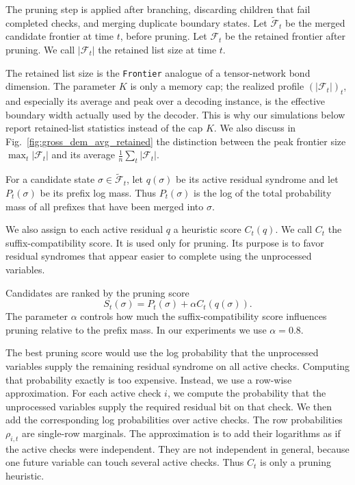 \documentclass[a4paper,twocolumn,11pt,unpublished]{quantumarticle}
\newcommand{\frontier}{\texttt{Frontier}}
\begin{document}
The pruning step is applied after branching, discarding children that fail
completed checks, and merging duplicate boundary states. Let
\(\widetilde{\mathcal F}_t\) be the merged candidate frontier at time \(t\),
before pruning. Let \(\mathcal F_t\) be the retained frontier after pruning. We
call \(|\mathcal F_t|\) the retained list size at time \(t\).


The retained list size is the \frontier{} analogue of a tensor-network
bond dimension. The parameter \(K\) is only a memory cap; the realized profile
\((|\mathcal F_t|)_t\), and especially its average and peak over a decoding
instance, is the effective boundary width actually used by the decoder. This is
why our simulations below report retained-list statistics instead of the cap \(K\). 
We also discuss in Fig.~\ref{fig:gross_dem_avg_retained} the distinction between the peak frontier size $\max_t |\mathcal{F}_t|$ and its average $\frac{1}{n} \sum_t |\mathcal{F}_t|$.



For a candidate state \(\sigma\in\widetilde{\mathcal F}_t\), let \(q(\sigma)\)
be its active residual syndrome and let \(P_t(\sigma)\) be its prefix log mass.
Thus \(P_t(\sigma)\) is the log of the total probability mass of all prefixes
that have been merged into \(\sigma\).

We also assign to each active residual \(q\) a heuristic score \(C_t(q)\). We
call \(C_t\) the suffix-compatibility score. It is used only for pruning. Its
purpose is to favor residual syndromes that appear easier to complete using the
unprocessed variables.

Candidates are ranked by the pruning score
\begin{equation}
    S_t(\sigma)=P_t(\sigma)+\alpha C_t(q(\sigma)).
    \label{eq:score}
\end{equation}
The parameter \(\alpha\) controls how much the suffix-compatibility score
influences pruning relative to the prefix mass. In our experiments we use
\(\alpha=0.8\).

The best pruning score would use the log probability that the unprocessed
variables supply the remaining residual syndrome on all active checks. Computing
that probability exactly is too expensive. Instead, we use a row-wise
approximation. For each active check \(i\), we compute the probability that the
unprocessed variables supply the required residual bit on that check. We then
add the corresponding log probabilities over active checks. The row probabilities \(\rho_{i,t}\) are single-row marginals. The approximation
is to add their logarithms as if the active checks were independent. They are
not independent in general, because one future variable can touch several active
checks. Thus \(C_t\) is only a pruning heuristic.
\end{document}
